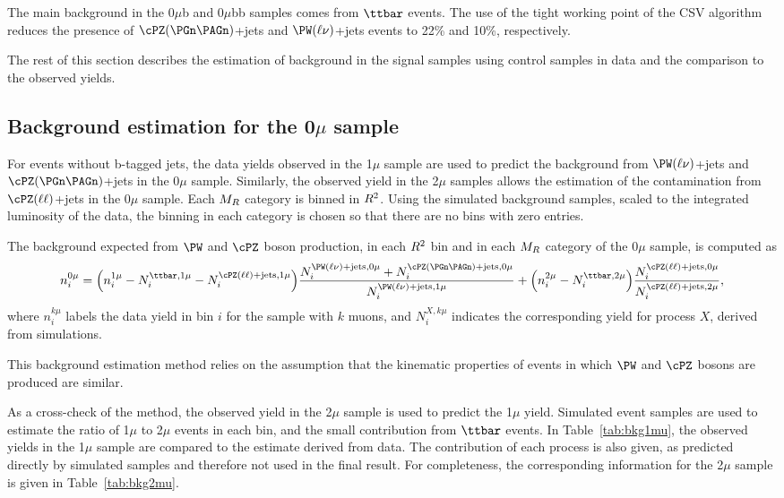 The main background in the 0$\mu$b and 0$\mu$bb samples comes from
$\ttbar$ events. The use of the tight working point of the CSV
algorithm reduces the presence of $\cPZ(\PGn\PAGn)$+jets
and $\PW(\ell\nu)$+jets events to 22\% and 10\%, respectively.

The rest of this section describes the estimation of background in the signal samples using control samples in data and the comparison to the
observed yields.

\subsection{Background estimation for the \texorpdfstring{0$\mu$}{0 mu} sample\label{sec:bkgzmu}}


For events without b-tagged jets, the data yields observed in the
1$\mu$ sample are used to predict the background from $\PW(\ell\nu)$+jets and
$\cPZ(\PGn\PAGn)$+jets in the 0$\mu$ sample.  Similarly, the
observed yield in the 2$\mu$ samples allows the estimation of
the contamination from $\cPZ(\ell \ell)$+jets in the 0$\mu$ sample. Each
$M_R$ category is binned in $R^2$. Using the simulated background samples, scaled to the
integrated luminosity of the data, the binning in each category is
chosen so that there are no bins with zero entries.

The background expected from $\PW$ and $\cPZ$ boson production, in
each $R^2$ bin and in each $M_R$ category of the 0$\mu$
sample, is computed as
\begin{equation}
  n_{i}^{0\mu} =  \Bigl(n_{i}^{1\mu} - N_{i}^{\ttbar,1\mu} - N_{i}^{\cPZ(\ell
    \ell)+\text{jets},1\mu}\Bigr) \frac{N_{i}^{\PW(\ell\nu)+\text{jets},0\mu}+N_{i}^{\cPZ(\PGn\PAGn)+\text{jets},0\mu}}{N_{i}^{\PW(\ell\nu)+\text{jets},1\mu}} +
\Bigl(n_{i}^{2\mu} - N_{i}^{\ttbar,2\mu}\Bigr) \frac{N_{i}^{\cPZ(\ell \ell)+\text{jets},0\mu}}{N_{i}^{\cPZ(\ell \ell)+\text{jets},2\mu}},
\end{equation}
where $n_{i}^{k\mu}$ labels the data yield in bin $i$ for the sample
with $k$ muons, and $N_{i}^{X,k\mu}$ indicates the corresponding yield
for process $X$, derived from simulations.

This background estimation method relies on the assumption that
the kinematic properties of events in which $\PW$ and $\cPZ$ bosons are
produced are similar.

As a cross-check of the method, the observed yield in the 2$\mu$ sample is used to
predict the 1$\mu$ yield. Simulated event samples are used to estimate
the ratio of 1$\mu$ to 2$\mu$ events in each bin, and the small
contribution from $\ttbar$ events.
In Table~\ref{tab:bkg1mu}, the observed yields in the 1$\mu$ sample
are compared to the estimate derived from data. The contribution of each process is also given,
as predicted directly by simulated samples and therefore not used in
the final result. For completeness, the corresponding
information for the 2$\mu$ sample is given in Table~\ref{tab:bkg2mu}.


